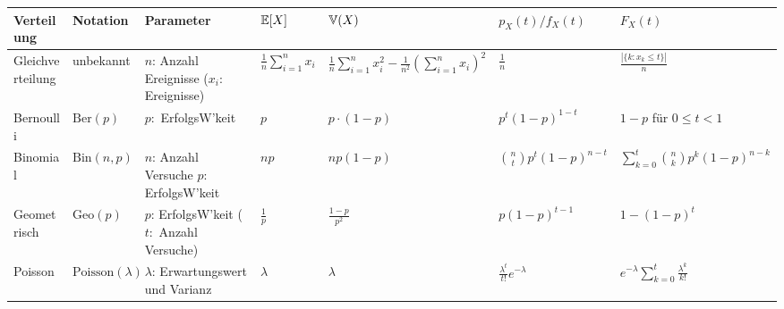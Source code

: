\renewcommand*{\arraystretch}{2}
\begin{center}

  \begin{tabularx}{\textwidth}{|l|l|l|X|X|X|X|}
    \hline
    Verteilung               & Notation                                               & Parameter                                           & \( \mathbb{E}[X] \)                      & \( \mathbb{V}(X) \)                                             & \( p_X(t)/f_X(t) \)                                                                                                                           & \( F_X(t) \)                                                               \\
    \hline
    \hline
    Gleichverteilung & unbekannt & \makecell[l]{\( n \): Anzahl Ereignisse                                                                                                   \\ (\( x_i \): Ereignisse)} & \( \frac{1}{n} \sum_{i=1}^{n} x_i \) & \( \frac{1}{n} \sum_{i=1}^{n} x_i^2 - \frac{1}{n^2} \left(\sum_{i=1}^{n} x_i \right)^2 \) & \( \frac{1}{n} \) & \( \frac{|\{k:x_k \leq t\}|}{n} \) \\
    \hline
    Bernoulli                & $\text{Ber}(p)$                                   & \( p: \) ErfolgsW'keit                              & \( p \)                          & \( p \cdot (1-p) \)                                       & \( p^t(1-p)^{1-t} \)                                                                                                                          & \( 1-p \) für \( 0 \leq t < 1 \)                                           \\
    \hline
    Binomial & $\text{Bin}(n,p)$        & \makecell[l] {\( n \): Anzahl Versuche                                                                                                    \\ \( p: \) ErfolgsW'keit } & \( np \) & \( np(1-p) \) & \( \binom{n}{t}p^t(1-p)^{n-t} \) & \( \sum_{k=0}^{t} \binom{n}{k} p^k(1-p)^{n-k} \)  \\
    \hline
    Geometrisch & $\text{Geo}(p)$     & \makecell[l] { \( p \): ErfolgsW'keit                                                                                                         \\ (\( t: \) Anzahl Versuche)} & \( \frac{1}{p} \) & \( \frac{1-p}{p^2} \) & \( p(1-p)^{t-1} \) & \( 1-(1-p)^t\) \\
    \hline
    Poisson&  $\text{Poisson}(\lambda)$   & \makecell[l]{ \( \lambda \): Erwartungswert                                                                                               \\ und Varianz} & \( \lambda \) & \( \lambda \) & \( \frac{\lambda^t}{t!}e^{-\lambda} \) & \( e^{-\lambda} \sum_{k=0}^{t} \frac{\lambda^{k}}{k!} \) \\

\end{tabularx}
\end{center}
